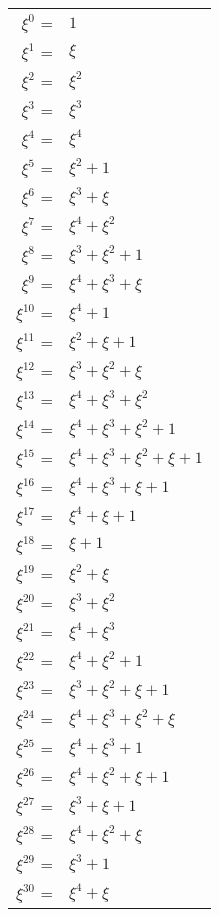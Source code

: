 \documentclass[fleqn]{article}
\begin{document}
    \begin{center}
        \begin{tabular}{r l}
            $\xi^0$    = & $1$ \\
            $\xi^1$    = & $\xi$ \\
            $\xi^2$    = & $\xi^2$ \\
            $\xi^3$    = & $\xi^3$ \\
            $\xi^4$    = & $\xi^4$ \\
            $\xi^5$    = & $\xi^2 + 1$ \\
            $\xi^6$    = & $\xi^3 + \xi$ \\
            $\xi^7$    = & $\xi^4 + \xi^2$ \\
            $\xi^8$    = & $\xi^3 + \xi^2 + 1$ \\
            $\xi^9$    = & $\xi^4 + \xi^3 + \xi$ \\
            $\xi^{10}$ = & $\xi^4 + 1$ \\
            $\xi^{11}$ = & $\xi^2 + \xi + 1$ \\
            $\xi^{12}$ = & $\xi^3 + \xi^2 + \xi$ \\
            $\xi^{13}$ = & $\xi^4 + \xi^3 + \xi^2$ \\
            $\xi^{14}$ = & $\xi^4 + \xi^3 + \xi^2 + 1$ \\
            $\xi^{15}$ = & $\xi^4 + \xi^3 + \xi^2 + \xi + 1$ \\
            $\xi^{16}$ = & $\xi^4 + \xi^3 + \xi + 1$ \\
            $\xi^{17}$ = & $\xi^4 + \xi + 1$ \\
            $\xi^{18}$ = & $\xi + 1$ \\
            $\xi^{19}$ = & $\xi^2 + \xi$ \\
            $\xi^{20}$ = & $\xi^3 + \xi^2$ \\
            $\xi^{21}$ = & $\xi^4 + \xi^3$ \\
            $\xi^{22}$ = & $\xi^4 + \xi^2 + 1$ \\
            $\xi^{23}$ = & $\xi^3 + \xi^2 + \xi + 1$ \\
            $\xi^{24}$ = & $\xi^4 + \xi^3 + \xi^2 + \xi$ \\
            $\xi^{25}$ = & $\xi^4 + \xi^3 + 1$ \\
            $\xi^{26}$ = & $\xi^4 + \xi^2 + \xi + 1$ \\
            $\xi^{27}$ = & $\xi^3 + \xi + 1$ \\
            $\xi^{28}$ = & $\xi^4 + \xi^2 + \xi$ \\
            $\xi^{29}$ = & $\xi^3 + 1$ \\
            $\xi^{30}$ = & $\xi^4 + \xi$ \\ \hline
        \end{tabular}
    \end{center}
\end{document}
